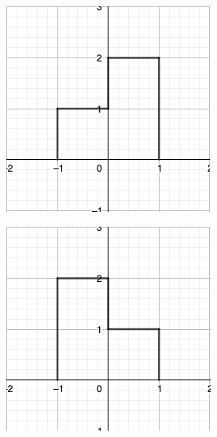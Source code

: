\documentclass[a4paper]{book}
\begin{document}
\begin{figure}[htb]
	\vspace{5 pt}

	\hfill
	\begin{subfigure}[b]{0.4\textwidth}
		\includegraphics[width=\textwidth]{./Imágenes/aaf.png}
	\end{subfigure}
	\hfill
	\begin{subfigure}[b]{0.4\textwidth}
		\includegraphics[width=\textwidth]{./Imágenes/aag.png}
	\end{subfigure}
	\hfill

	\label{fig:señales_reflejadas}
\end{figure}
\end{document}
